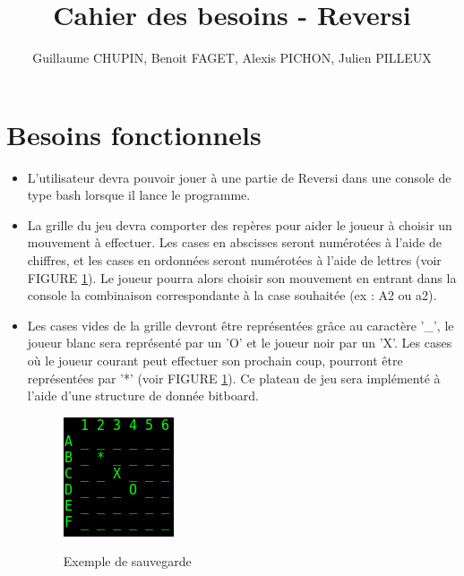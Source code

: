 \documentclass[10pt, a4paper]{article}
\title {Cahier des besoins - Reversi}
\author {Guillaume CHUPIN, Benoit FAGET, Alexis PICHON, Julien PILLEUX}
\begin{document}
\maketitle
\thispagestyle {empty}
\newpage
\tableofcontents
\newpage

\section {Besoins fonctionnels}
\begin {itemize}
\item L'utilisateur devra pouvoir jouer à une partie de Reversi dans une console de type bash lorsque il lance le programme.
\item La grille du jeu devra comporter des repères pour aider le joueur à choisir un mouvement à effectuer. Les cases en abscisses seront numérotées à l'aide de chiffres, et les cases en ordonnées seront numérotées à l'aide de lettres (voir FIGURE \ref{exemple_board}). Le joueur pourra alors choisir son mouvement en entrant dans la console la combinaison correspondante à la case souhaitée (ex : A2 ou a2).
\item Les cases vides de la grille devront être représentées grâce au caractère '\_', le joueur blanc sera représenté par un 'O' et le joueur noir par un 'X'. Les cases où le joueur courant peut effectuer son prochain coup, pourront être représentées par '*' (voir FIGURE \ref{exemple_board}). Ce plateau de jeu sera implémenté à l'aide d'une structure de donnée bitboard.
  \begin {figure}[H]
    \centering
    \includegraphics [scale = 0.5]{images/exemple_board.png}
    \label {exemple_board}
    \caption {Exemple de sauvegarde}
  \end   {figure}
  

\end{itemize}
\end{document}
